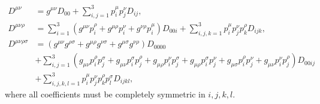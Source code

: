 \documentclass[../main.tex]{subfiles}
\begin{document}
\begin{subequations}
\begin{align}
                    D^{\mu\nu}           & = g^{\mu\nu} D_{00} + \sum_{i,j=1}^{3} p_i^\mu p_j^\nu D_{ij},                                                                                                                                                         \\
                    D^{\mu\nu\rho}       & = \sum_{i=1}^3 (g^{\mu\nu} p_i^{\rho} + g^{\mu\rho} p_i^{\nu} + g^{\nu\rho} p_i^{\mu}) D_{00i} + \sum_{i,j,k=1}^3 p_i^\mu p_j^\nu p_k^\rho D_{ijk},                                                                    \\
                    \nonumber
                    D^{\mu\nu\rho\sigma} & = (g^{\mu\nu}g^{\rho\sigma} + g^{\mu\rho}g^{\nu\sigma} + g^{\mu\sigma}g^{\nu\rho})D_{0000}                                                                                                                             \\
                    \nonumber
                                         & + \sum_{i,j=1}^3 (g_{\mu\nu}p_i^\rho p_j^\sigma + g_{\mu\nu}p_i^\sigma p_j^\rho + g_{\mu\rho}p_i^\nu p_j^\sigma + g_{\mu\rho}p_i^\sigma p_j^\nu + g_{\mu\sigma}p_i^\rho p_j^\nu + g_{\mu\nu}p_i^\nu p_j^\rho) D_{00ij} \\
                                         & + \sum_{i,j,k,l=1}^3 p_i^\mu p_j^\nu p_k^\rho p_l^\sigma D_{ijkl},
                \end{align}
            \end{subequations}
            where all coefficients must be completely symmetric in \(i,j,k,l\).
\end{document}

